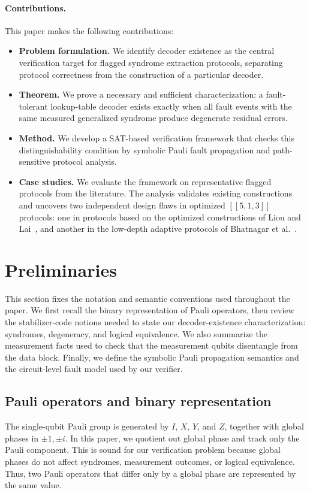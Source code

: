 \documentclass[acmsmall,screen,review,anonymous,nonacm]{acmart}
\begin{document}
\paragraph{\textbf{Contributions.}}
This paper makes the following contributions:
\begin{itemize}
\item \textbf{Problem formulation.} We identify decoder existence as the central verification target for flagged syndrome extraction protocols, separating protocol correctness from the construction of a particular decoder.

\item \textbf{Theorem.} We prove a necessary and sufficient characterization: a fault-tolerant lookup-table decoder exists exactly when all fault events with the same measured generalized syndrome produce degenerate residual errors.

\item \textbf{Method.} We develop a SAT-based verification framework that checks this distinguishability condition by symbolic Pauli fault propagation and path-sensitive protocol analysis.

\item \textbf{Case studies.} We evaluate the framework on representative flagged protocols from the literature. The analysis validates existing constructions and uncovers two independent design flaws in optimized $[[5,1,3]]$ protocols: one in protocols based on the optimized constructions of Liou and Lai~\cite{Liou25}, and another in the low-depth adaptive protocols of Bhatnagar et al.~\cite{low-depth}.

\end{itemize}

\section{Preliminaries}
This section fixes the notation and semantic conventions used throughout the paper. We first recall the binary representation of Pauli operators, then review the stabilizer-code notions needed to state our decoder-existence characterization: syndromes, degeneracy, and logical equivalence. We also summarize the measurement facts used to check that the measurement qubits disentangle from the data block. Finally, we define the symbolic Pauli propagation semantics and the circuit-level fault model used by our verifier.
\subsection{Pauli operators and binary representation}
The single-qubit Pauli group is generated by $I$, $X$, $Y$, and $Z$, together with global phases in ${\pm 1,\pm i}$. In this paper, we quotient out global phase and track only the Pauli component. This is sound for our verification problem because global phases do not affect syndromes, measurement outcomes, or logical equivalence. Thus, two Pauli operators that differ only by a global phase are represented by the same value.
\end{document}
